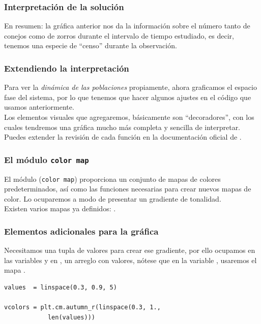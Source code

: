 \begin{frame}
\frametitle{Interpretación de la solución}
En resumen: la gráfica anterior nos da la información sobre el número tanto de conejos como de zorros durante el intervalo de tiempo estudiado, es decir, tenemos una especie de \enquote{censo} durante la observación.
\end{frame}
\begin{frame}
\frametitle{Extendiendo la interpretación}
Para ver la \emph{dinámica de las poblaciones} propiamente, ahora graficamos el espacio fase del sistema, por lo que tenemos que hacer algunos ajustes en el código que usamos anteriormente.
\\
\bigskip
Los elementos visuales que agregaremos, básicamente son \enquote{decoradores}, con los cuales tendremos una gráfica mucho más completa y sencilla de interpretar. Puedes extender la revisión de cada función en la documentación oficial de \python.
\end{frame}
\begin{frame}[fragile]
\frametitle{El módulo \texttt{color map}}
El módulo  (\texttt{color map}) proporciona un conjunto de mapas de colores predeterminados, así como las funciones necesarias para crear nuevos mapas de color. Lo ocuparemos a modo de presentar un gradiente de tonalidad.
\\
\bigskip
Existen varios mapas ya definidos: .
\end{frame}
\begin{frame}[fragile]
\frametitle{Elementos adicionales para la gráfica}
Necesitamos una tupla de valores para crear ese gradiente, por ello ocupamos en las variables  y en , un arreglo con valores, nótese que en la variable , usaremos el mapa .
\begin{verbatim}
values  = linspace(0.3, 0.9, 5)                         

vcolors = plt.cm.autumn_r(linspace(0.3, 1.,
            len(values)))  
\end{verbatim}
\end{frame}
